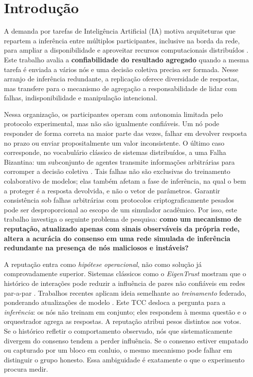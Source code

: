 \documentclass[12pt]{article}
\begin{document}
\section{Introdução}

A demanda por tarefas de Inteligência Artificial (IA) motiva arquiteturas que repartem a inferência entre múltiplos participantes, inclusive na borda da rede, para ampliar a disponibilidade e aproveitar recursos computacionais distribuídos \cite{shi2016,tanenbaum2017,coulouris2021,russell2020}. Este trabalho avalia a \textbf{confiabilidade do resultado agregado} quando a mesma tarefa é enviada a vários nós e uma decisão coletiva precisa ser formada. Nesse arranjo de inferência redundante, a replicação oferece diversidade de respostas, mas transfere para o mecanismo de agregação a responsabilidade de lidar com falhas, indisponibilidade e manipulação intencional.

Nessa organização, os participantes operam com autonomia limitada pelo protocolo experimental, mas não são igualmente confiáveis. Um nó pode responder de forma correta na maior parte das vezes, falhar em devolver resposta no prazo ou enviar propositalmente um valor inconsistente. O último caso corresponde, no vocabulário clássico de sistemas distribuídos, a uma Falha Bizantina: um subconjunto de agentes transmite informações arbitrárias para corromper a decisão coletiva \cite{lamport1982,castro1999}. Tais falhas não são exclusivas do treinamento colaborativo de modelos; elas também afetam a fase de inferência, na qual o bem a proteger é a resposta devolvida, e não o vetor de parâmetros. Garantir consistência sob falhas arbitrárias com protocolos criptograficamente pesados pode ser desproporcional ao escopo de um simulador acadêmico. Por isso, este trabalho investiga o seguinte problema de pesquisa: \textbf{como um mecanismo de reputação, atualizado apenas com sinais observáveis da própria rede, altera a acurácia do consenso em uma rede simulada de inferência redundante na presença de nós maliciosos e instáveis?}

A reputação entra como \emph{hipótese operacional}, não como solução já comprovadamente superior. Sistemas clássicos como o \textit{EigenTrust} mostram que o histórico de interações pode reduzir a influência de pares não confiáveis em redes par-a-par \cite{kamvar2003}. Trabalhos recentes aplicam ideia semelhante ao \emph{treinamento} federado, ponderando atualizações de modelo \cite{chen2024}. Este TCC desloca a pergunta para a \emph{inferência}: os nós não treinam em conjunto; eles respondem à mesma questão e o orquestrador agrega as respostas. A reputação atribui pesos distintos aos votos. Se o histórico refletir o comportamento observado, nós que sistematicamente divergem do consenso tendem a perder influência. Se o consenso estiver empatado ou capturado por um bloco em conluio, o mesmo mecanismo pode falhar em distinguir o grupo honesto. Essa ambiguidade é exatamente o que o experimento procura medir.
\end{document}
